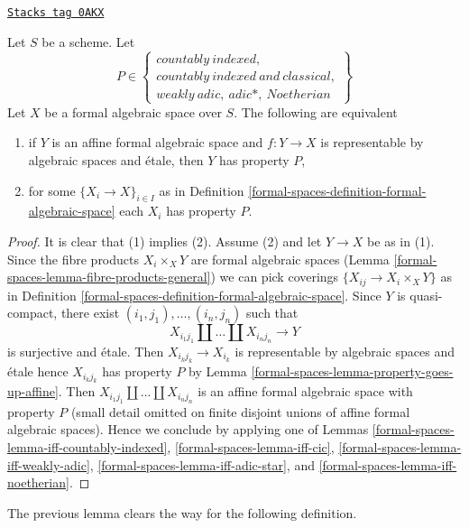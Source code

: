 \begin{lemma}
\label{formal-spaces-lemma-type-local}
\href{https://stacks.math.columbia.edu/tag/0AKX}{\texttt{Stacks tag 0AKX}}

Let $S$ be a scheme. Let
$$
P \in
\left\{
\begin{matrix}
countably\ indexed,\\
countably\ indexed\ and\ classical,\\
weakly\ adic,\ adic*,\ Noetherian
\end{matrix}
\right\}
$$
Let $X$ be a formal algebraic space over $S$.
The following are equivalent
\begin{enumerate}
\item if $Y$ is an affine formal algebraic space and
$f : Y \to X$ is representable by algebraic spaces and \'etale,
then $Y$ has property $P$,
\item for some $\{X_i \to X\}_{i \in I}$ as in
Definition \ref{formal-spaces-definition-formal-algebraic-space}
each $X_i$ has property $P$.
\end{enumerate}
\end{lemma}

\begin{proof}
It is clear that (1) implies (2). Assume (2) and let
$Y \to X$ be as in (1). Since the fibre products $X_i \times_X Y$
are formal algebraic spaces (Lemma \ref{formal-spaces-lemma-fibre-products-general})
we can pick coverings $\{X_{ij} \to X_i \times_X Y\}$ as in
Definition \ref{formal-spaces-definition-formal-algebraic-space}.
Since $Y$ is quasi-compact, there exist
$(i_1, j_1), \ldots, (i_n, j_n)$ such that
$$
X_{i_1 j_1} \amalg \ldots \amalg X_{i_n j_n} \longrightarrow Y
$$
is surjective and \'etale. Then $X_{i_kj_k} \to X_{i_k}$ is representable
by algebraic spaces and \'etale hence $X_{i_kj_k}$ has property $P$ by
Lemma \ref{formal-spaces-lemma-property-goes-up-affine}.
Then $X_{i_1 j_1} \amalg \ldots \amalg X_{i_n j_n}$ is an
affine formal algebraic space with property $P$ (small detail
omitted on finite disjoint unions of affine formal algebraic spaces).
Hence we conclude by applying one of
Lemmas \ref{formal-spaces-lemma-iff-countably-indexed},
\ref{formal-spaces-lemma-iff-cic},
\ref{formal-spaces-lemma-iff-weakly-adic},
\ref{formal-spaces-lemma-iff-adic-star}, and
\ref{formal-spaces-lemma-iff-noetherian}.
\end{proof}

The previous lemma clears the way for the following definition.

